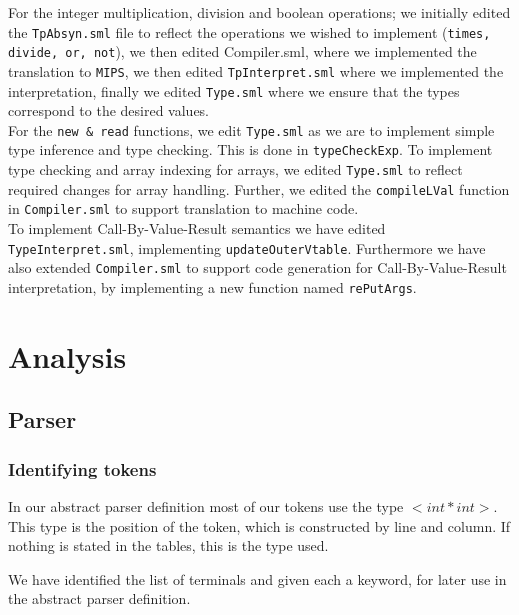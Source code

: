 \documentclass[10pt]{article}
\begin{document}
For the integer multiplication, division and boolean operations; we initially edited the \texttt{TpAbsyn.sml} file to reflect the operations we wished to implement (\texttt{times, divide, or, not}), we then edited Compiler.sml, where we implemented the translation to \texttt{MIPS}, we then edited \texttt{TpInterpret.sml} where we implemented the interpretation, finally we edited \texttt{Type.sml} where we ensure that the types correspond to the desired values.\\ 
For the \texttt{new \& read} functions, we edit \texttt{Type.sml} as we are to implement simple type inference and type checking. This is done in \texttt{typeCheckExp}.
To implement type checking and array indexing for arrays, we edited \texttt{Type.sml} to reflect required changes for array handling. Further, we edited the \texttt{compileLVal} function in \texttt{Compiler.sml} to support translation to machine code.\\

To implement Call-By-Value-Result semantics we have edited \texttt{TypeInterpret.sml}, implementing \texttt{updateOuterVtable}. Furthermore we have also extended \texttt{Compiler.sml} to support code generation for Call-By-Value-Result interpretation, by implementing a new function named \texttt{rePutArgs}. 

\section{Analysis}
\subsection{Parser}
\subsubsection{Identifying tokens}
In our abstract parser definition most of our tokens use the type $<int*int>$. This type is the position of the token, which is constructed by line and column. If nothing is stated in the tables, this is the type used.

We have identified the list of terminals and given each a keyword, for later use in the abstract parser definition.
\end{document}

